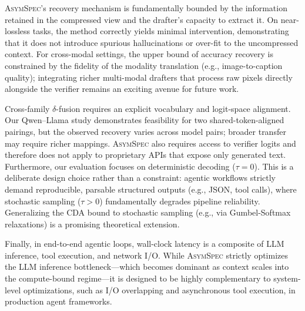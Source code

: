\documentclass[11pt]{article}
\newcommand{\crchange}[1]{#1}
\theoremstyle{plain}
\theoremstyle{definition}
\begin{document}
\textsc{AsymSpec}'s recovery mechanism is fundamentally bounded by the information retained in the compressed view and the drafter's capacity to extract it. On near-lossless tasks, the method correctly yields minimal intervention, demonstrating that it does not introduce spurious hallucinations or over-fit to the uncompressed context. For cross-modal settings, the upper bound of accuracy recovery is constrained by the fidelity of the modality translation (e.g., image-to-caption quality); integrating richer multi-modal drafters that process raw pixels directly alongside the verifier remains an exciting avenue for future work.

\crchange{Cross-family $\delta$-fusion requires an explicit vocabulary and logit-space alignment. Our Qwen--Llama study demonstrates feasibility for two shared-token-aligned pairings, but the observed recovery varies across model pairs; broader transfer may require richer mappings. \textsc{AsymSpec} also requires access to verifier logits and therefore does not apply to proprietary APIs that expose only generated text.} Furthermore, our evaluation focuses on deterministic decoding ($\tau{=}0$). This is a deliberate design choice rather than a constraint: agentic workflows strictly demand reproducible, parsable structured outputs (e.g., JSON, tool calls), where stochastic sampling ($\tau > 0$) fundamentally degrades pipeline reliability. Generalizing the CDA bound to stochastic sampling (e.g., via Gumbel-Softmax relaxations) is a promising theoretical extension.

Finally, in end-to-end agentic loops, wall-clock latency is a composite of LLM inference, tool execution, and network I/O. While \textsc{AsymSpec} strictly optimizes the LLM inference bottleneck---which becomes dominant as context scales into the compute-bound regime---it is designed to be highly complementary to system-level optimizations, such as I/O overlapping and asynchronous tool execution, in production agent frameworks.



\appendix

\end{document}
